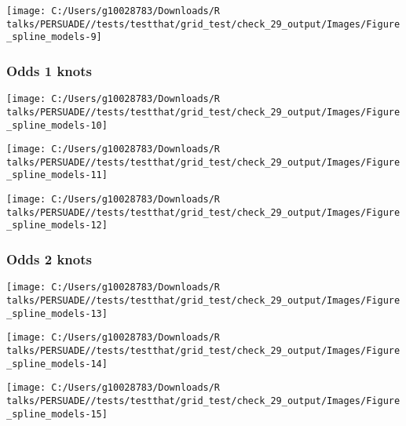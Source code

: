 \documentclass[
]{article}
\begin{document}
\begin{flushleft}\texttt{[image: C:/Users/g10028783/Downloads/R talks/PERSUADE//tests/testthat/grid\_test/check\_29\_output/Images/Figure\_spline\_models-9]} \end{flushleft}

\clearpage

\subsubsection{Odds 1 knots}\label{odds-1-knots}

\begin{flushleft}\texttt{[image: C:/Users/g10028783/Downloads/R talks/PERSUADE//tests/testthat/grid\_test/check\_29\_output/Images/Figure\_spline\_models-10]} \end{flushleft}

\begin{flushleft}\texttt{[image: C:/Users/g10028783/Downloads/R talks/PERSUADE//tests/testthat/grid\_test/check\_29\_output/Images/Figure\_spline\_models-11]} \end{flushleft}

\begin{flushleft}\texttt{[image: C:/Users/g10028783/Downloads/R talks/PERSUADE//tests/testthat/grid\_test/check\_29\_output/Images/Figure\_spline\_models-12]} \end{flushleft}

\clearpage

\subsubsection{Odds 2 knots}\label{odds-2-knots}

\begin{flushleft}\texttt{[image: C:/Users/g10028783/Downloads/R talks/PERSUADE//tests/testthat/grid\_test/check\_29\_output/Images/Figure\_spline\_models-13]} \end{flushleft}

\begin{flushleft}\texttt{[image: C:/Users/g10028783/Downloads/R talks/PERSUADE//tests/testthat/grid\_test/check\_29\_output/Images/Figure\_spline\_models-14]} \end{flushleft}

\begin{flushleft}\texttt{[image: C:/Users/g10028783/Downloads/R talks/PERSUADE//tests/testthat/grid\_test/check\_29\_output/Images/Figure\_spline\_models-15]} \end{flushleft}
\end{document}
